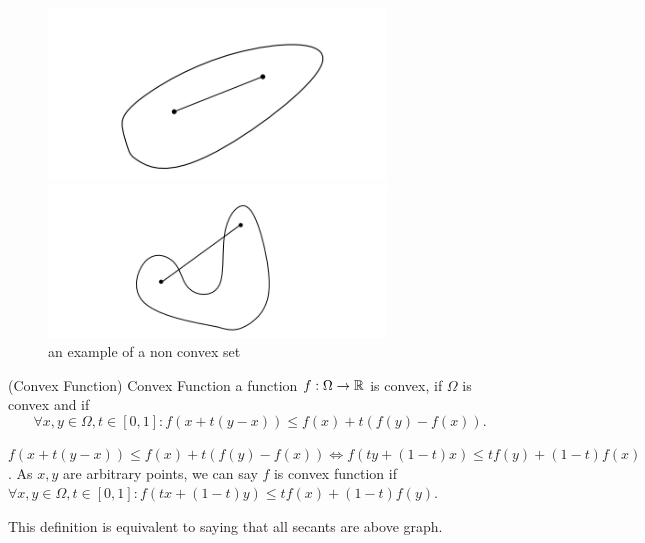 \begin{figure}[htbp]
    \begin{minipage}[t]{0.5\linewidth}
        \centering
        \includegraphics[width=0.8\textwidth]{figure/ch1/convex_set1.png}
        \caption{an example of a convex set}
    \end{minipage}%
    \begin{minipage}[t]{0.5\linewidth}
        \centering
        \includegraphics[width=0.8\textwidth]{figure/ch1/non_convex_set1.png}
        \caption{an example of a non convex set}
    \end{minipage}
\end{figure}


\begin{definition}{
    (Convex Function) %
  }{Convex Function
  }
    {
        a function $f: \Omega \rightarrow \mathbb{R}$ is convex, if $\Omega$ is convex and if
         \begin{equation}
            \forall x,y \in \Omega, t\in [0,1]: f(x+t(y-x))\leq f(x)+t(f(y)-f(x)). 
         \end{equation}
    }
\end{definition}
\begin{remark}
    $f(x+t(y-x))\leq f(x)+t(f(y)-f(x)) \Longleftrightarrow 
    f(ty+(1-t)x) \leq tf(y) + (1-t)f(x) $. As $x,y$ are arbitrary points, we can say $f$ is convex function if
    \ $\forall x,y \in \Omega, t\in [0,1]: f(tx+(1-t)y)\leq tf(x)+(1-t)f(y)$. 
\end{remark}
\begin{remark}
    This definition is equivalent to saying that
    all secants are above graph.
\end{remark}


